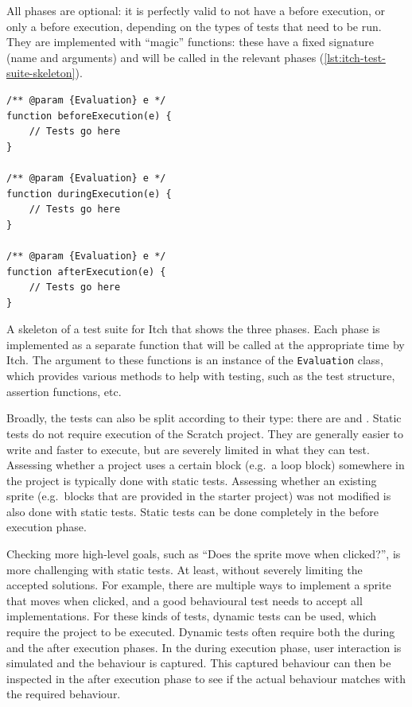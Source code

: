 \documentclass[../main]{subfiles}
\begin{document}
All phases are optional: it is perfectly valid to not have a before execution, or only a before execution, depending on the types of tests that need to be run.
They are implemented with ``magic'' functions: these have a fixed signature (name and arguments) and will be called in the relevant phases (\cref{lst:itch-test-suite-skeleton}).

\begin{listing}
    \begin{verbatim}
/** @param {Evaluation} e */
function beforeExecution(e) {
    // Tests go here
}

/** @param {Evaluation} e */
function duringExecution(e) {
    // Tests go here
}

/** @param {Evaluation} e */
function afterExecution(e) {
    // Tests go here
}
    \end{verbatim}
    \caption[]{
        A skeleton of a test suite for Itch that shows the three phases.
        Each phase is implemented as a separate function that will be called at the appropriate time by Itch.
        The argument to these functions is an instance of the \texttt{Evaluation} class, which provides various methods to help with testing, such as the test structure, assertion functions, etc.
    }
    \label{lst:itch-test-suite-skeleton}
\end{listing}

Broadly, the tests can also be split according to their type: there are  and .
Static tests do not require execution of the Scratch project.
They are generally easier to write and faster to execute, but are severely limited in what they can test.
Assessing whether a project uses a certain block (e.g.\ a loop block) somewhere in the project is typically done with static tests.
Assessing whether an existing sprite (e.g.\ blocks that are provided in the starter project) was not modified is also done with static tests.
Static tests can be done completely in the before execution phase.

Checking more high-level goals, such as ``Does the sprite move when clicked?'', is more challenging with static tests.
At least, without severely limiting the accepted solutions.
For example, there are multiple ways to implement a sprite that moves when clicked, and a good behavioural test needs to accept all implementations.
For these kinds of tests, dynamic tests can be used, which require the project to be executed.
Dynamic tests often require both the during and the after execution phases.
In the during execution phase, user interaction is simulated and the behaviour is captured.
This captured behaviour can then be inspected in the after execution phase to see if the actual behaviour matches with the required behaviour.
\end{document}
